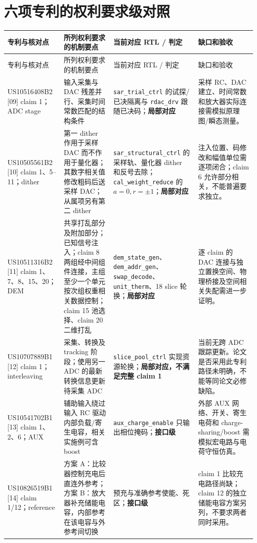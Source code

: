\documentclass[UTF8,fontset=fandol,11pt,a4paper,openany]{ctexrep}
\newcommand{\code}[1]{\nolinkurl{#1}}
\newcommand{\grade}[1]{\textbf{#1}}
\begin{document}
\chapter{六项专利的权利要求级对照}
\small
\begin{longtable}{>{\raggedright\arraybackslash}p{27mm}>{\raggedright\arraybackslash}p{40mm}>{\raggedright\arraybackslash}p{43mm}>{\raggedright\arraybackslash}p{34mm}}
\toprule 专利与核对点&所列权利要求的机制要点&当前对应 RTL / 判定&缺口和验收\tabularnewline\midrule\endfirsthead
\toprule 专利与核对点&所列权利要求的机制要点&当前对应 RTL / 判定&缺口和验收\tabularnewline\midrule\endhead
US10516408B2 [09] claim 1；ADC stage&输入采集与 DAC 残差并行、采集时间常数匹配的结构条件&\code{sar_trial_ctrl} 的试探/已决隔离与 \code{rdac_drv} 跟随已决码；\grade{局部对应}&采样 RC、DAC 建立、时间常数和放大器实际连接需模拟原理图/瞬态测量。\tabularnewline
US10505561B2 [10] claim 1、5--11；dither&第一 dither 作用于采样 DAC 而不作用于量化器；其数字相关值修改粗码后送采样 DAC；从属项另有第二 dither&\code{sar_structural_ctrl} 的采样轨、量化器 dither 和反号去除；\code{cal_weight_reduce} 的 \(a=0,r=\pm1\)；\grade{局部对应}&注入位置、码修改和幅值单位需逐项闭合；claim 6 允许部分相关，不能普遍要求独立。\tabularnewline
US10511316B2 [11] claim 1、7、8、15、20；DEM&共享打乱部分及附加部分；已知信号注入；claim 8 两组经中间组件连接，主组至少一个单元按次组权重相关数据控制；claim 15 池选择、claim 20 二维打乱&\code{dem_state_gen}、\code{dem_addr_gen}、\code{swap_decode}、\code{unit_therm}、18 slice 轮换；\grade{局部对应}&逐 claim 的 DAC 连接与独立置换空间、物理桥接及空间相关失配需进一步证明。\tabularnewline
US10707889B1 [12] claim 1；interleaving&采集、转换及 tracking 阶段；使用另一 ADC 的最新转换信息更新待采集 ADC&\code{slice_pool_ctrl} 实现资源轮换；\grade{局部对应，不满足完整 claim 1}&当前无跨 ADC 跟踪更新。论文是否采用此专利路径未明确，不能等同论文必修缺陷。\tabularnewline
US10541702B1 [13] claim 1、2、6；AUX&辅助输入绕过输入 RC 驱动内部负载/寄生电容，相关实施例可含 boost&\code{aux_charge_enable} 只输出相位掩码；\grade{接口级}&外部 AUX 网络、开关、寄生电荷和 charge-sharing/boost 需模拟宏电路与电荷守恒仿真。\tabularnewline
US10826519B1 [14] claim 1/12；reference&方案 A：比较器控制充电后直连外参考；方案 B：放大器补充储能电容，内部参考在该电容与外参考间切换&预充与准确参考使能、死区；\grade{接口级}&claim 1 比较充电路径尚缺；claim 12 的独立储能电容方案另列，不要求两者同时采用。\tabularnewline
\bottomrule
\end{longtable}
\normalsize
\end{document}
